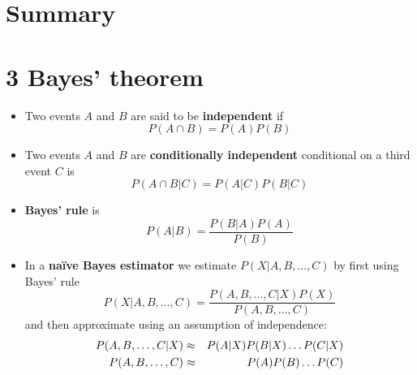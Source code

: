 
\ifind
\section*{Summary}
\else
\section*{3 Bayes' theorem}
\fi

\begin{itemize}
\item Two events $A$ and $B$ are said to be \textbf{independent} if 
\begin{equation}
P(A\cap B)=P(A)P(B)
\end{equation}
\item  Two events $A$ and $B$
are \textbf{conditionally independent} conditional on a third event
$C$ is
\begin{equation}
P(A\cap B|C)=P(A|C)P(B|C)
\end{equation}
\item \textbf{Bayes' rule} is
  \begin{equation}
    P(A|B)=\frac{P(B|A)P(A)}{P(B)}
\end{equation}
\item In a \textbf{na\"ive Bayes estimator} we estimate $P(X|A,B,\ldots,C)$ by first using Bayes' rule
  \begin{equation}
    P(X|A,B,\ldots,C)=\frac{P(A,B,\ldots,C|X)P(X)}{P(A,B,\ldots,C)}
  \end{equation}
  and then approximate using an assumption of independence:
  \begin{eqnarray}
    P(A,B,\ldots,C|X)&\approx&P(A|X)P(B|X)\ldots P(C|X)\cr
    P(A,B,\ldots,C)&\approx&P(A)P(B)\ldots P(C)
  \end{eqnarray}
\end{itemize}

